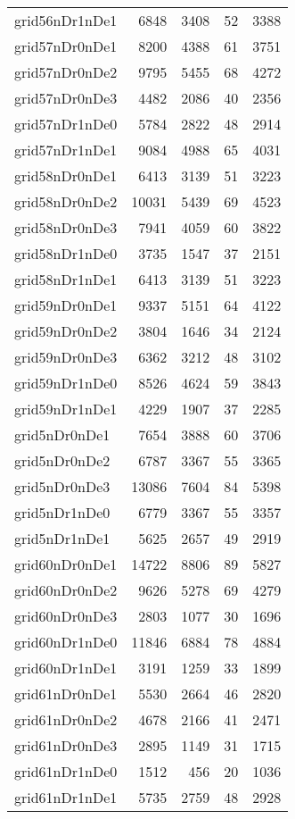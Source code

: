 \documentclass[../../../thesis.tex]{subfiles}
\begin{document}
\begin{longtable}{lrrrr}
grid56nDr1nDe1 & 6848 & 3408 & 52 & 3388 \\
grid57nDr0nDe1 & 8200 & 4388 & 61 & 3751 \\
grid57nDr0nDe2 & 9795 & 5455 & 68 & 4272 \\
grid57nDr0nDe3 & 4482 & 2086 & 40 & 2356 \\
grid57nDr1nDe0 & 5784 & 2822 & 48 & 2914 \\
grid57nDr1nDe1 & 9084 & 4988 & 65 & 4031 \\
grid58nDr0nDe1 & 6413 & 3139 & 51 & 3223 \\
grid58nDr0nDe2 & 10031 & 5439 & 69 & 4523 \\
grid58nDr0nDe3 & 7941 & 4059 & 60 & 3822 \\
grid58nDr1nDe0 & 3735 & 1547 & 37 & 2151 \\
grid58nDr1nDe1 & 6413 & 3139 & 51 & 3223 \\
grid59nDr0nDe1 & 9337 & 5151 & 64 & 4122 \\
grid59nDr0nDe2 & 3804 & 1646 & 34 & 2124 \\
grid59nDr0nDe3 & 6362 & 3212 & 48 & 3102 \\
grid59nDr1nDe0 & 8526 & 4624 & 59 & 3843 \\
grid59nDr1nDe1 & 4229 & 1907 & 37 & 2285 \\
grid5nDr0nDe1 & 7654 & 3888 & 60 & 3706 \\
grid5nDr0nDe2 & 6787 & 3367 & 55 & 3365 \\
grid5nDr0nDe3 & 13086 & 7604 & 84 & 5398 \\
grid5nDr1nDe0 & 6779 & 3367 & 55 & 3357 \\
grid5nDr1nDe1 & 5625 & 2657 & 49 & 2919 \\
grid60nDr0nDe1 & 14722 & 8806 & 89 & 5827 \\
grid60nDr0nDe2 & 9626 & 5278 & 69 & 4279 \\
grid60nDr0nDe3 & 2803 & 1077 & 30 & 1696 \\
grid60nDr1nDe0 & 11846 & 6884 & 78 & 4884 \\
grid60nDr1nDe1 & 3191 & 1259 & 33 & 1899 \\
grid61nDr0nDe1 & 5530 & 2664 & 46 & 2820 \\
grid61nDr0nDe2 & 4678 & 2166 & 41 & 2471 \\
grid61nDr0nDe3 & 2895 & 1149 & 31 & 1715 \\
grid61nDr1nDe0 & 1512 & 456 & 20 & 1036 \\
grid61nDr1nDe1 & 5735 & 2759 & 48 & 2928 \\

\end{longtable}
\end{document}
